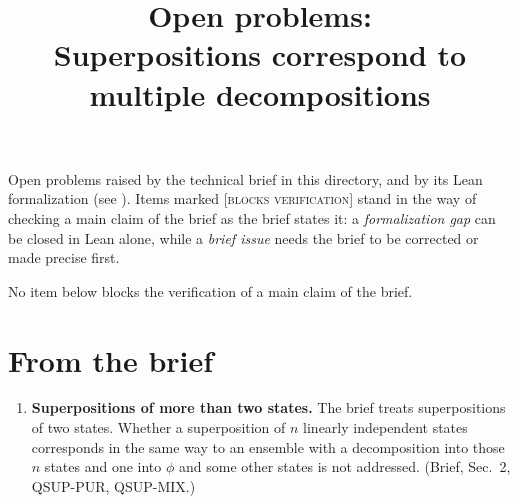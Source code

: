\documentclass[11pt]{article}
\title{Open problems:\\ Superpositions correspond to multiple decompositions}
\author{}
\date{}
\begin{document}
\maketitle

\noindent
Open problems raised by the technical brief in this directory, and by its Lean formalization
(see ).
Items marked \textsc{[blocks verification]} stand in the way of checking a main
claim of the brief as the brief states it: a \emph{formalization gap} can be closed
in Lean alone, while a \emph{brief issue} needs the brief to be corrected or made
precise first.

No item below blocks the verification of a main claim of the brief.

\section*{From the brief}
\begin{enumerate}
\item \textbf{Superpositions of more than two states.} The brief treats superpositions of two
  states. Whether a superposition of $n$ linearly independent states corresponds in the same way
  to an ensemble with a decomposition into those $n$ states and one into $\phi$ and some other
  states is not addressed. (Brief, Sec.~2, QSUP-PUR, QSUP-MIX.)
\end{enumerate}
\end{document}

